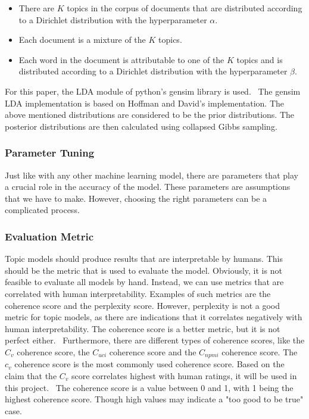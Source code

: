 \begin{itemize}
    \item There are $K$ topics in the corpus of documents that are distributed according to a Dirichlet distribution with the hyperparameter $\alpha$.
    \item Each document is a mixture of the $K$ topics.
    \item Each word in the document is attributable to one of the $K$ topics and is distributed according to a Dirichlet distribution with the hyperparameter $\beta$.
\end{itemize}

For this paper, the LDA module of python's gensim library is used.~\cite{rehurek_lrec} The gensim LDA implementation is based on Hoffman and David's implementation. The above mentioned distributions are considered to be the prior distributions. The posterior distributions are then calculated using collapsed Gibbs sampling.

\subsubsection{Parameter Tuning}

Just like with any other machine learning model, there are parameters that play a crucial role in the accuracy of the model. These parameters are assumptions that we have to make. However, choosing the right parameters can be a complicated process.

\subsubsection*{Evaluation Metric}

Topic models should produce results that are interpretable by humans. This should be the metric that is used to evaluate the model. Obviously, it is not feasible to evaluate all models by hand. Instead, we can use metrics that are correlated with human interpretability. Examples of such metrics are the coherence score and the perplexity score. However, perplexity is not a good metric for topic models, as there are indications that it correlates negatively with human interpretability. The coherence score is a better metric, but it is not perfect either.~\cite{egger2022topic} Furthermore, there are different types of coherence scores, like the $C_v$ coherence score, the $C_{uci}$ coherence score and the $C_{npmi}$ coherence score. The $c_v$ coherence score is the most commonly used coherence score. Based on the claim that the $C_v$ score correlates highest with human ratings, it will be used in this project.~\cite{roder2015exploring} The coherence score is a value between 0 and 1, with 1 being the highest coherence score. Though high values may indicate a "too good to be true" case.  %

